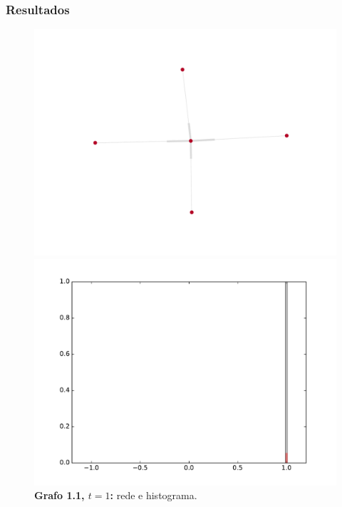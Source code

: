 \begin{frame}
  \frametitle{Resultados}

  \begin{figure}
  \centering
  \begin{minipage}{5.5cm}
    \includegraphics[width=\textwidth]{./figures/11N1}
  \end{minipage}
  \begin{minipage}{5.5cm}
    \includegraphics[width=\textwidth]{./figures/11H1}
  \end{minipage}
  \vspace{5mm}
  \caption*{\textbf{Grafo 1.1, $t = 1$:} rede e histograma.}
  \end{figure}
\end{frame}

